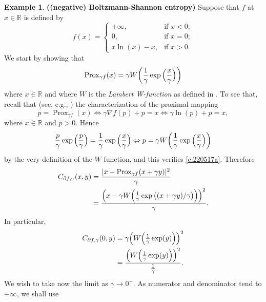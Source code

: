 \documentclass[12pt]{article}
\providecommand{\siff}{\Leftrightarrow}
\newcommand{\RR}{\ensuremath{\mathbb R}}
\newcommand{\prox}{\ensuremath{\operatorname{Prox}}}
\newcommand{\pinf}{\ensuremath{+\infty}}
\theoremstyle{definition}
\newtheorem{example}[theorem]{Example}
\DeclarePairedDelimiter{\parens}{\lparen}{\rparen}
\providecommand{\RR}{\mathbb{R}}
\providecommand{\RR}{\mathbb{R}}
\begin{document}
{\begin{example} {\bf ((negative) Boltzmann-Shannon entropy)} 
Suppose that $f$ at $x\in\RR$ is defined by 
\begin{equation}
f(x)=\begin{cases}
+\infty,&\text{if }x<0;\\
0,&\text{if }x=0;\\
x\ln(x)-x,&\text{if }x>0.
\end{cases}
\end{equation}
We start by showing that 
\begin{equation}
\label{e:220517a}
\prox_{\gamma f} (x)=\gamma  W\parens*{\frac{1}{\gamma} 
\exp\Big(\frac{x}{\gamma}\Big)}%
\end{equation}
where $x\in\RR$ and 
where $W$ is the \emph{Lambert W-function} as defined in \cite[Equation 1.5]{W}.
To see that, recall that (see, e.g., \cite[Proposition~24.1]{BC2017}) the 
characterization of the proximal mapping
\begin{equation}
p=\prox_{\gamma f} (x) \siff \gamma\nabla f(p) + p=x\siff
\gamma \ln (p)+p=x,
\end{equation}
where $x\in\RR$ and $p>0$. 
Hence
\begin{equation}
\frac{p}{\gamma}\exp\Big(\frac{p}{\gamma}\Big)=\frac{1}{\gamma}\exp\Big(\frac{x}{\gamma}\Big) \siff p=\gamma W\parens*{\frac{1}{\gamma}\exp\Big(\frac{x}{\gamma}\Big)}
\end{equation}
by the very definition of the $W$ function, and this verifies \cref{e:220517a}. 
Therefore
\begin{subequations}
\begin{align}
C_{\partial f,\gamma}(x,y)
&= 
\frac{|x-\prox_{\gamma f}(x+\gamma y)|^2}{\gamma}\\
&= \frac{\parens*{x-\gamma W\parens*{\frac{1}{\gamma}
\exp\big((x+\gamma y)/\gamma\big)}}^2}{\gamma}.
\end{align}
\end{subequations}
In particular, 
\begin{subequations}
\begin{align}
C_{\partial f,\gamma}(0,y) 
&= \gamma\parens*{ W\parens*{\tfrac{1}{\gamma}\exp( y)}}^2\\
&=\frac{\parens*{ W\parens*{\frac{1}{\gamma}\exp( y)}}^2}{\tfrac{1}{\gamma}}. 
\end{align}
\end{subequations}
We wish to take now the limit as $\gamma\to 0^+$.
As numerator and denominator tend to $\pinf$, we shall use 

\end{example}}
\end{document}
